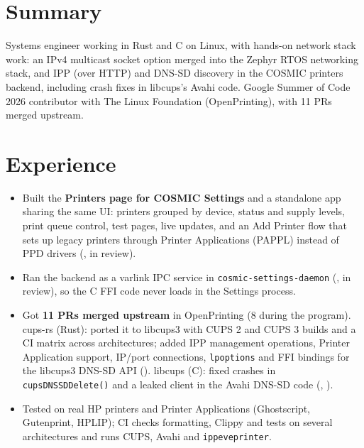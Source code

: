 \documentclass[10pt]{article}
\begin{document}

\section*{Summary}
Systems engineer working in Rust and C on Linux, with hands-on network stack work: an IPv4 multicast socket option merged into the Zephyr RTOS networking stack, and IPP (over HTTP) and DNS-SD discovery in the COSMIC printers backend, including crash fixes in libcups's Avahi code. Google Summer of Code 2026 contributor with The Linux Foundation (OpenPrinting), with 11 PRs merged upstream.

\section*{Experience}
\begin{itemize}
  \item Built the \textbf{Printers page for COSMIC Settings} and a standalone app sharing the same UI: printers grouped by device, status and supply levels, print queue control, test pages, live updates, and an Add Printer flow that sets up legacy printers through Printer Applications (PAPPL) instead of PPD drivers (, in review).
  \item Ran the backend as a varlink IPC service in \texttt{cosmic-settings-daemon} (, in review), so the C FFI code never loads in the Settings process.
  \item Got \textbf{11 PRs merged upstream} in OpenPrinting (8 during the program). cups-rs (Rust): ported it to libcups3 with CUPS 2 and CUPS 3 builds and a CI matrix across architectures; added IPP management operations, Printer Application support, IP/port connections, \texttt{lpoptions} and FFI bindings for the libcups3 DNS-SD API (). libcups (C): fixed crashes in \texttt{cupsDNSSDDelete()} and a leaked client in the Avahi DNS-SD code (, ).
  \item Tested on real HP printers and Printer Applications (Ghostscript, Gutenprint, HPLIP); CI checks formatting, Clippy and tests on several architectures and runs CUPS, Avahi and \texttt{ippeveprinter}.
\end{itemize}
\end{document}
